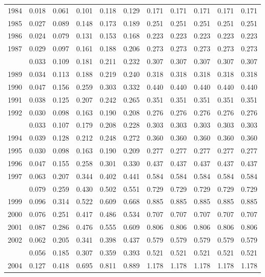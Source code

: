\documentclass[
]{article}
\begin{document}
\begin{longtable}[t]{lrrrrrrrrrr}
1984 & 0.018 & 0.061 & 0.101 & 0.118 & 0.129 & 0.171 & 0.171 & 0.171 & 0.171 & 0.171\\
1985 & 0.027 & 0.089 & 0.148 & 0.173 & 0.189 & 0.251 & 0.251 & 0.251 & 0.251 & 0.251\\
1986 & 0.024 & 0.079 & 0.131 & 0.153 & 0.168 & 0.223 & 0.223 & 0.223 & 0.223 & 0.223\\
1987 & 0.029 & 0.097 & 0.161 & 0.188 & 0.206 & 0.273 & 0.273 & 0.273 & 0.273 & 0.273\\
\addlinespace
1988 & 0.033 & 0.109 & 0.181 & 0.211 & 0.232 & 0.307 & 0.307 & 0.307 & 0.307 & 0.307\\
1989 & 0.034 & 0.113 & 0.188 & 0.219 & 0.240 & 0.318 & 0.318 & 0.318 & 0.318 & 0.318\\
1990 & 0.047 & 0.156 & 0.259 & 0.303 & 0.332 & 0.440 & 0.440 & 0.440 & 0.440 & 0.440\\
1991 & 0.038 & 0.125 & 0.207 & 0.242 & 0.265 & 0.351 & 0.351 & 0.351 & 0.351 & 0.351\\
1992 & 0.030 & 0.098 & 0.163 & 0.190 & 0.208 & 0.276 & 0.276 & 0.276 & 0.276 & 0.276\\
\addlinespace
1993 & 0.033 & 0.107 & 0.179 & 0.208 & 0.228 & 0.303 & 0.303 & 0.303 & 0.303 & 0.303\\
1994 & 0.039 & 0.128 & 0.212 & 0.248 & 0.272 & 0.360 & 0.360 & 0.360 & 0.360 & 0.360\\
1995 & 0.030 & 0.098 & 0.163 & 0.190 & 0.209 & 0.277 & 0.277 & 0.277 & 0.277 & 0.277\\
1996 & 0.047 & 0.155 & 0.258 & 0.301 & 0.330 & 0.437 & 0.437 & 0.437 & 0.437 & 0.437\\
1997 & 0.063 & 0.207 & 0.344 & 0.402 & 0.441 & 0.584 & 0.584 & 0.584 & 0.584 & 0.584\\
\addlinespace
1998 & 0.079 & 0.259 & 0.430 & 0.502 & 0.551 & 0.729 & 0.729 & 0.729 & 0.729 & 0.729\\
1999 & 0.096 & 0.314 & 0.522 & 0.609 & 0.668 & 0.885 & 0.885 & 0.885 & 0.885 & 0.885\\
2000 & 0.076 & 0.251 & 0.417 & 0.486 & 0.534 & 0.707 & 0.707 & 0.707 & 0.707 & 0.707\\
2001 & 0.087 & 0.286 & 0.476 & 0.555 & 0.609 & 0.806 & 0.806 & 0.806 & 0.806 & 0.806\\
2002 & 0.062 & 0.205 & 0.341 & 0.398 & 0.437 & 0.579 & 0.579 & 0.579 & 0.579 & 0.579\\
\addlinespace
2003 & 0.056 & 0.185 & 0.307 & 0.359 & 0.393 & 0.521 & 0.521 & 0.521 & 0.521 & 0.521\\
2004 & 0.127 & 0.418 & 0.695 & 0.811 & 0.889 & 1.178 & 1.178 & 1.178 & 1.178 & 1.178\\

\end{longtable}
\end{document}
